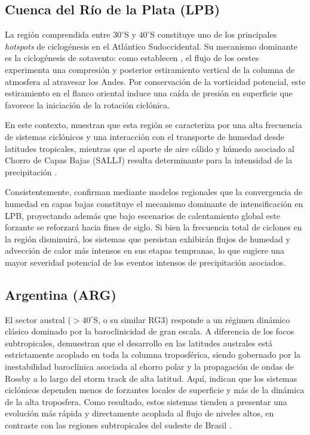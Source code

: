 \subsection{Cuenca del Río de la Plata (LPB)}\label{subsec:tb_lpb}

La región comprendida entre $30^\circ$S y $40^\circ$S constituye uno de los principales \textit{hotspots} de ciclogénesis en el Atlántico Sudoccidental. Su mecanismo dominante es la ciclogénesis de sotavento: como establecen \citet{gan1994influence}, el flujo de los oestes experimenta una compresión y posterior estiramiento vertical de la columna de atmosfera al atravesar los Andes. Por conservación de la vorticidad potencial, este estiramiento en el flanco oriental induce una caída de presión en superficie que favorece la iniciación de la rotación ciclónica. 

En este contexto, \citet{reboita2010south} muestran que esta región se caracteriza por una alta frecuencia de sistemas ciclónicos y una interacción con el transporte de humedad desde latitudes tropicales, mientras que el aporte de aire cálido y húmedo asociado al Chorro de Capas Bajas (SALLJ) resulta determinante para la intensidad de la precipitación \citep{crespo2020potential}.

Consistentemente, \citet{gramcianinov2024early} confirman mediante modelos regionales que la convergencia de humedad en capas bajas constituye el mecanismo dominante de intensificación en LPB, proyectando además que bajo escenarios de calentamiento global este forzante se reforzará hacia fines de siglo. Si bien la frecuencia total de ciclones en la región disminuirá, los sistemas que persistan exhibirán flujos de humedad y advección de calor más intensos en sus etapas tempranas, lo que sugiere una mayor severidad potencial de los eventos intensos de precipitación asociados.

\subsection{Argentina (ARG)}\label{subsec:tb_arg}

El sector austral ($>40^\circ$S, o su similar RG3) responde a un régimen dinámico clásico dominado por la baroclinicidad de gran escala. A diferencia de los focos subtropicales, \citet{hoskins2005new} demuestran que el desarrollo en las latitudes australes está estrictamente acoplado en toda la columna troposférica, siendo gobernado por la inestabilidad baroclínica asociada al chorro polar y la propagación de ondas de Rossby a lo largo del storm track de alta latitud. Aquí, \citet{simmonds2000variability} indican que los sistemas ciclónicos dependen menos de forzantes locales de superficie y más de la dinámica de la alta troposfera. Como resultado, estos sistemas tienden a presentar una evolución más rápida y directamente acoplada al flujo de niveles altos, en contraste con las regiones subtropicales del sudeste de Brasil \citep{vera2002cold}. 


